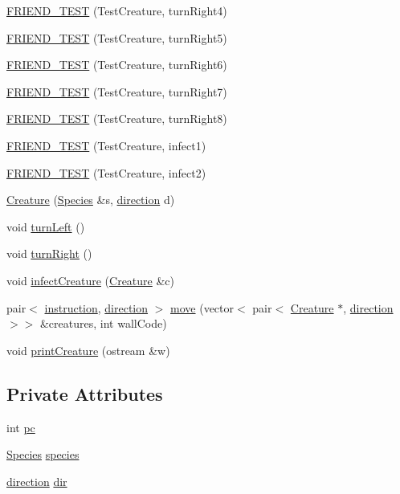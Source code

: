 \begin{DoxyCompactItemize}
\hyperlink{classCreature_ac8bfb3308d01f718a17ec3bc97675dde}{F\-R\-I\-E\-N\-D\-\_\-\-T\-E\-S\-T} (Test\-Creature, turn\-Right4)
\item 
\hyperlink{classCreature_a1c37ca076759a4d1b7c9afb9d97393f7}{F\-R\-I\-E\-N\-D\-\_\-\-T\-E\-S\-T} (Test\-Creature, turn\-Right5)
\item 
\hyperlink{classCreature_a9a626b09cee5d19d14341243b3cfceee}{F\-R\-I\-E\-N\-D\-\_\-\-T\-E\-S\-T} (Test\-Creature, turn\-Right6)
\item 
\hyperlink{classCreature_a649cb47b05144af2f9a3fd598e21e6ef}{F\-R\-I\-E\-N\-D\-\_\-\-T\-E\-S\-T} (Test\-Creature, turn\-Right7)
\item 
\hyperlink{classCreature_a752873cb5336e4a5b07f564c9414ef79}{F\-R\-I\-E\-N\-D\-\_\-\-T\-E\-S\-T} (Test\-Creature, turn\-Right8)
\item 
\hyperlink{classCreature_ab0c2582ee272da6e1fa12769245634b2}{F\-R\-I\-E\-N\-D\-\_\-\-T\-E\-S\-T} (Test\-Creature, infect1)
\item 
\hyperlink{classCreature_ac18a539e0b94a9f8c3f8db69b9d6dbf3}{F\-R\-I\-E\-N\-D\-\_\-\-T\-E\-S\-T} (Test\-Creature, infect2)
\item 
\hyperlink{classCreature_ab06f4acb5492d719492a9e1c0e9bfbb5}{Creature} (\hyperlink{classSpecies}{Species} \&s, \hyperlink{Creature_8h_a99f26e6ee9fcd62f75203b5402df8098}{direction} d)
\item 
void \hyperlink{classCreature_a6775207403a361d6d25f5ee1db58ef94}{turn\-Left} ()
\item 
void \hyperlink{classCreature_a6d10fbf41bcf61c1cddc82400003f1e7}{turn\-Right} ()
\item 
void \hyperlink{classCreature_afcc5686024f4695db483dcde6cc75c3f}{infect\-Creature} (\hyperlink{classCreature}{Creature} \&c)
\item 
pair$<$ \hyperlink{Species_8h_a8d53f52811787ac7b91d1fd31f23c5e3}{instruction}, \hyperlink{Creature_8h_a99f26e6ee9fcd62f75203b5402df8098}{direction} $>$ \hyperlink{classCreature_a66df846dbc27588f2adaf67d18f9c77d}{move} (vector$<$ pair$<$ \hyperlink{classCreature}{Creature} $\ast$, \hyperlink{Creature_8h_a99f26e6ee9fcd62f75203b5402df8098}{direction} $>$$>$ \&creatures, int wall\-Code)
\item 
void \hyperlink{classCreature_a973106b50b812e0d8920d9d7daa521b1}{print\-Creature} (ostream \&w)
\end{DoxyCompactItemize}
\subsection*{Private Attributes}
\begin{DoxyCompactItemize}
\item 
int \hyperlink{classCreature_a81b808ceee6ddc5c0a97e0b97b19a707}{pc}
\item 
\hyperlink{classSpecies}{Species} \hyperlink{classCreature_ab0b67d0fe5520b895a7b3a4af4e80506}{species}
\item 
\hyperlink{Creature_8h_a99f26e6ee9fcd62f75203b5402df8098}{direction} \hyperlink{classCreature_a2082340eb3388d31fb6f982b81978261}{dir}
\end{DoxyCompactItemize}


